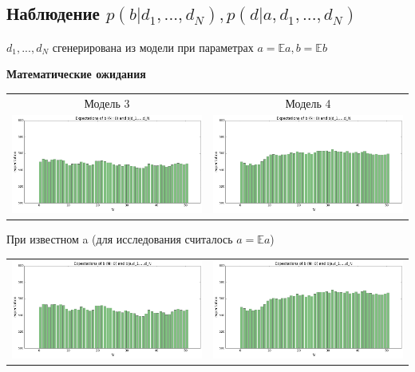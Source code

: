 \documentclass[12pt, a4paper]{article}
\begin{document}
		\newpage
		\subsection{Наблюдение $p(b|d_1, ..., d_N), p(d|a, d_1, ..., d_N)$}
			\begin{center}
			
			$d_1, ..., d_N$ сгенерирована из модели при параметрах $a = \mathbb{E}a, b = \mathbb{E}b$
			
			\textbf{Математические ожидания}
			\begin{tabular}{ c  c }
  				Модель 3 & Модель 4 \\
  				\includegraphics[width=8.5cm]{expec_m3_d_gen.png} &
  				\includegraphics[width=8.5cm]{expec_m4_d_gen.png} \\
  			\end{tabular}
  			
  			При известном a (для исследования считалось $a = \mathbb{E}a$)
  			\begin{tabular}{ c  c }
  				\includegraphics[width=8.5cm]{expec_m3_ad_gen.png} &
  				\includegraphics[width=8.5cm]{expec_m4_ad_gen.png} \\
			\end{tabular}
			

\end{center}
\end{document}

